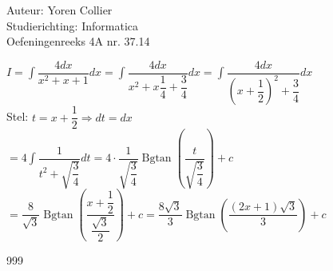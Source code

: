 \documentclass[a4paper]{article}
\newcommand{\adR}{\Rightarrow} %
\newcommand{\Lh}{\left(} %
\newcommand{\Rh}{\right)}
\newcommand{\intgrl}{\displaystyle\int} %
\begin{document}
\noindent \large Auteur: Yoren Collier \\
\noindent \large Studierichting: Informatica\\
\noindent \large Oefeningenreeks 4A nr. 37.14\\

\medskip

\normalsize

$ I =  \intgrl \dfrac{4dx}{x^2 +x +1} dx = \intgrl \dfrac{4dx}{x^2 +x \dfrac{1}{4} + \dfrac{3}{4}} dx = \intgrl \dfrac{4dx}{\Lh x + \dfrac{1}{2} \Rh^2 + \dfrac{3}{4}} dx$\\

Stel: $t = x + \dfrac{1}{2} \adR dt = dx$\\

$= 4\intgrl \dfrac{1}{t^2 + \sqrt{\dfrac{3}{4}}} dt = 4 \cdot \dfrac{1}{\sqrt{\dfrac{3}{4}}} \operatorname{Bgtan} \Lh \dfrac{t}{\sqrt{\dfrac{3}{4}}} \Rh +c$\\

$= \dfrac{8}{\sqrt{3}} \operatorname{Bgtan} \Lh \dfrac{x + \dfrac{1}{2}}{\dfrac{\sqrt{3}}{2}} \Rh +c = \dfrac{8\sqrt{3}}{3} \operatorname{Bgtan} \Lh \dfrac{\Lh 2x + 1 \Rh \sqrt{3}}{3} \Rh +c$\\

\begin{thebibliography}{999}
\end{thebibliography}
\end{document}
